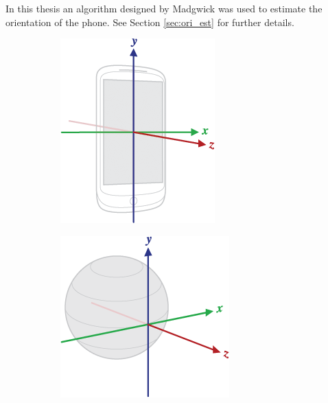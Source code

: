 In this thesis an algorithm designed by Madgwick was used to estimate the orientation of the phone. See Section \ref{sec:ori_est} for further details.

\begin{figure}[hbt!]
    \centering
    \begin{subfigure}{0.4\textwidth}
        \includegraphics[height=1.0\linewidth]{figures/coords_phone.png}
        \caption{}
    \end{subfigure}
    \begin{subfigure}{0.4\textwidth}
        \includegraphics[height=1.0\linewidth]{figures/coords_global.png}

\end{subfigure}
\end{figure}
